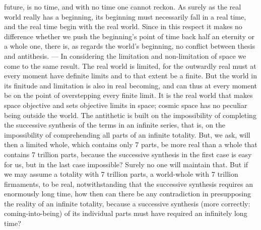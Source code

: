 \documentclass[12pt]{article}
\begin{document}
future, is no time, and with no time one cannot reckon. As surely as the
real world really has a beginning, its beginning must necessarily fall in a
real time, and the real time begin with the real world. Since in this
respect it makes no difference whether we push the beginning's point of
time back half an eternity or a whole one, there is, as regards the world's
beginning, no conflict between thesis and antithesis. --- In considering
the limitation and non-limitation of space we come to the same result. The
real world is limited, for the outwardly real must at every moment have
definite limits and to that extent be a finite. But the world in its
finitude and limitation is also in real becoming, and can thus at every
moment be on the point of overstepping every finite limit. It is the real
world that makes space objective and sets objective limits in space; cosmic
space has no peculiar being outside the world. The antithetic is built on
the impossibility of completing the successive synthesis of the terms in an
infinite series, that is, on the impossibility of comprehending all parts
of an infinite totality. But, we ask, will then a limited
whole, which contains only 7 parts, be more real than a whole that contains
7 trillion parts, because the successive synthesis in the first case is
easy for us, but in the last case impossible? Surely no one will maintain
that. But if we may assume a totality with 7 trillion parts, a world-whole
with 7 trillion firmaments, to be real, notwithstanding that the successive
synthesis requires an enormously long time, how then can there be any
contradiction in presupposing the reality of an infinite totality, because
a successive synthesis (more correctly: coming-into-being) of its
individual parts must have required an infinitely long time?
\end{document}
